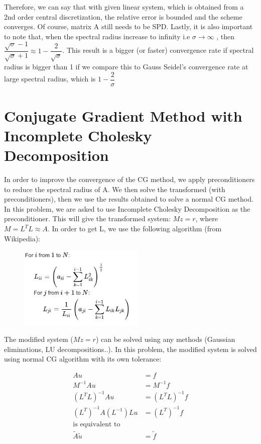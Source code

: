 \documentclass{article}
\begin{document}
\noindent
Therefore, we can say that with given linear system, which is obtained from a 2nd order central discretization, the relative error is bounded and the scheme converges. Of course, matrix A still needs to be SPD. Lastly, it is also important to note that, when the spectral radius increase to infinity i.e $\sigma \rightarrow \infty$ , then $\dfrac{\sqrt{\sigma }-1}{\sqrt{\sigma}+1} \approx 1- \dfrac{2}{\sqrt{\sigma}}$.  This result is a bigger (or faster) convergence rate if spectral radius is bigger than 1 if we compare this to Gauss Seidel's convergence rate at large spectral radius, which is $1- \dfrac{2}{\sigma}$


\section{Conjugate Gradient Method with Incomplete Cholesky Decomposition}

In order to improve the convergence of the CG method, we apply preconditioners to reduce the spectral radius of A. We then solve the transformed (with preconditioners), then we use the results obtained to solve a normal CG method. In this problem, we are asked to use Incomplete Cholesky Decomposition as the preconditioner.  This will give the transformed system: $Mz = r$, where $M = L^TL \approx A$. In order to get L, we use the following algorithm (from Wikipedia): 

\begin{figure}[H]
	\includegraphics[width=60mm]{incomplete_cholesky.png}
\end{figure}

\noindent
The modified system ($Mz = r$) can be solved using any methods (Gaussian eliminations, LU decompositions..). In this problem, the modified system is solved using normal CG algorithm with its own tolerance: 

\begin{align*}
	Au &= f\\
	M^{-1}Au &= M^{-1}f\\
	(L^TL)^{-1}Au&=(L^TL)^{-1}f\\
	(L^T)^{-1}A(L^{-1})Lu &= (L^T)^{-1}f	\\
	\textrm{is equivalent to} \\
	\tilde{A}\tilde{u} &= \tilde{f}
\end{align*}
\end{document}
